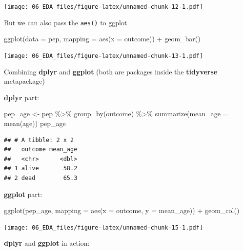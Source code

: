\documentclass[
  10pt,
]{krantz}
\newenvironment{Shaded}{\begin{snugshade}}{\end{snugshade}}
\newcommand{\AttributeTok}[1]{\textcolor[rgb]{0.77,0.63,0.00}{#1}}
\newcommand{\FunctionTok}[1]{\textcolor[rgb]{0.00,0.00,0.00}{#1}}
\newcommand{\NormalTok}[1]{#1}
\newcommand{\OtherTok}[1]{\textcolor[rgb]{0.56,0.35,0.01}{#1}}
\newcommand{\SpecialCharTok}[1]{\textcolor[rgb]{0.00,0.00,0.00}{#1}}
\begin{document}
\texttt{[image: 06\_EDA\_files/figure-latex/unnamed-chunk-12-1.pdf]}

But we can also pass the \texttt{aes()} to ggplot

\begin{Shaded}
\begin{Highlighting}[]
\FunctionTok{ggplot}\NormalTok{(}\AttributeTok{data =}\NormalTok{ pep, }\AttributeTok{mapping =} \FunctionTok{aes}\NormalTok{(}\AttributeTok{x =}\NormalTok{ outcome)) }\SpecialCharTok{+} 
  \FunctionTok{geom\_bar}\NormalTok{()}
\end{Highlighting}
\end{Shaded}

\texttt{[image: 06\_EDA\_files/figure-latex/unnamed-chunk-13-1.pdf]}

Combining \textbf{dplyr} and \textbf{ggplot} (both are packages inside the \textbf{tidyverse} metapackage)

\textbf{dplyr} part:

\begin{Shaded}
\begin{Highlighting}[]
\NormalTok{pep\_age }\OtherTok{\textless{}{-}}\NormalTok{ pep }\SpecialCharTok{\%\textgreater{}\%} \FunctionTok{group\_by}\NormalTok{(outcome) }\SpecialCharTok{\%\textgreater{}\%} 
  \FunctionTok{summarize}\NormalTok{(}\AttributeTok{mean\_age =} \FunctionTok{mean}\NormalTok{(age)) }
\NormalTok{pep\_age}
\end{Highlighting}
\end{Shaded}

\begin{verbatim}
## # A tibble: 2 x 2
##   outcome mean_age
##   <chr>      <dbl>
## 1 alive       58.2
## 2 dead        65.3
\end{verbatim}

\textbf{ggplot} part:

\begin{Shaded}
\begin{Highlighting}[]
\FunctionTok{ggplot}\NormalTok{(pep\_age, }\AttributeTok{mapping =} \FunctionTok{aes}\NormalTok{(}\AttributeTok{x =}\NormalTok{ outcome, }\AttributeTok{y =}\NormalTok{ mean\_age)) }\SpecialCharTok{+} 
  \FunctionTok{geom\_col}\NormalTok{()}
\end{Highlighting}
\end{Shaded}

\texttt{[image: 06\_EDA\_files/figure-latex/unnamed-chunk-15-1.pdf]}

\textbf{dplyr} and \textbf{ggplot} in action:
\end{document}
